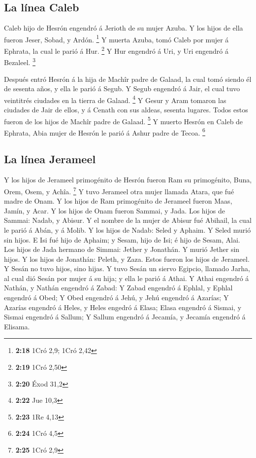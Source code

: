 \hypertarget{la-luxednea-caleb}{%
\subsection{La línea Caleb}\label{la-luxednea-caleb}}

 Caleb hijo de Hesrón engendró á Jerioth de su mujer Azuba.
Y los hijos de ella fueron Jeser, Sobad, y Ardón. \footnote{\textbf{2:18}
  1Cró 2,9; 1Cró 2,42}  Y muerta Azuba, tomó Caleb por
mujer á Ephrata, la cual le parió á Hur. \footnote{\textbf{2:19} 1Cró
  2,50}  Y Hur engendró á Uri, y Uri engendró á Bezaleel.
\footnote{\textbf{2:20} Éxod 31,2}

 Después entró Hesrón á la hija de Machîr padre de Galaad,
la cual tomó siendo él de sesenta años, y ella le parió á Segub.
 Y Segub engendró á Jair, el cual tuvo veintitrés ciudades
en la tierra de Galaad. \footnote{\textbf{2:22} Jue 10,3} 
Y Gesur y Aram tomaron las ciudades de Jair de ellos, y á Cenath con sus
aldeas, sesenta lugares. Todos estos fueron de los hijos de Machîr padre
de Galaad. \footnote{\textbf{2:23} 1Re 4,13}  Y muerto
Hesrón en Caleb de Ephrata, Abia mujer de Hesrón le parió á Ashur padre
de Tecoa. \footnote{\textbf{2:24} 1Cró 4,5}

\hypertarget{la-luxednea-jerameel}{%
\subsection{La línea Jerameel}\label{la-luxednea-jerameel}}

 Y los hijos de Jerameel primogénito de Hesrón fueron Ram
su primogénito, Buna, Orem, Osem, y Achîa. \footnote{\textbf{2:25} 1Cró
  2,9}  Y tuvo Jerameel otra mujer llamada Atara, que fué
madre de Onam.  Y los hijos de Ram primogénito de Jerameel
fueron Maas, Jamín, y Acar.  Y los hijos de Onam fueron
Sammai, y Jada. Los hijos de Sammai: Nadab, y Abisur.  Y el
nombre de la mujer de Abisur fué Abihail, la cual le parió á Abán, y á
Molib.  Y los hijos de Nadab: Seled y Aphaim. Y Seled murió
sin hijos.  E Isi fué hijo de Aphaim; y Sesam, hijo de Isi;
é hijo de Sesam, Alai.  Los hijos de Jada hermano de
Simmai: Jether y Jonathán. Y murió Jether sin hijos.  Y los
hijos de Jonathán: Peleth, y Zaza. Estos fueron los hijos de Jerameel.
 Y Sesán no tuvo hijos, sino hijas.  Y tuvo
Sesán un siervo Egipcio, llamado Jarha, al cual dió Sesán por mujer á su
hija; y ella le parió á Athai.  Y Athai engendró á Nathán,
y Nathán engendró á Zabad:  Y Zabad engendró á Ephlal, y
Ephlal engendró á Obed;  Y Obed engendró á Jehú, y Jehú
engendró á Azarías;  Y Azarías engendró á Heles, y Heles
engedró á Elasa;  Elasa engendró á Sismai, y Sismai
engendró á Sallum;  Y Sallum engendró á Jecamía, y Jecamía
engendró á Elisama.

